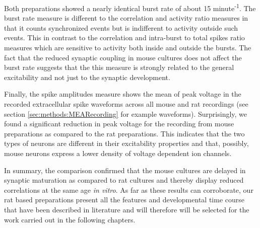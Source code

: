     Both preparations showed a nearly identical burst rate of about 15 minute\textsuperscript{-1}. The burst rate measure is different to the correlation and activity ratio measures in that it counts synchronized events but is indifferent to activity outside such events. This in contrast to the correlation and intra-burst to total spikes ratio measures which are sensitive to activity both inside and outside the bursts. The fact that the reduced synaptic coupling in mouse cultures does not affect the burst rate suggests that the this measure is strongly related to the general excitability and not just to the synaptic development.

    Finally, the spike amplitudes measure shows the mean of peak voltage in the recorded extracellular spike waveforms across all mouse and rat recordings (see section \ref{sec:methods:MEARecording} for example waveforms). Surprisingly, we found a significant reduction in peak voltage for the recording from mouse preparations as compared to the rat preparations. This indicates that the two types of neurons are different in their excitability properties and that, possibly, mouse neurons express a lower density of voltage dependent ion channels.

    In summary, the comparison confirmed that the mouse cultures are delayed in synaptic maturation as compared to rat cultures and thereby display reduced correlations at the same age \textit{in vitro}. As far as these results can corroborate, our rat based preparations present all the features and developmental time course that have been described in literature and will therefore will be selected for the work carried out in the following chapters.


